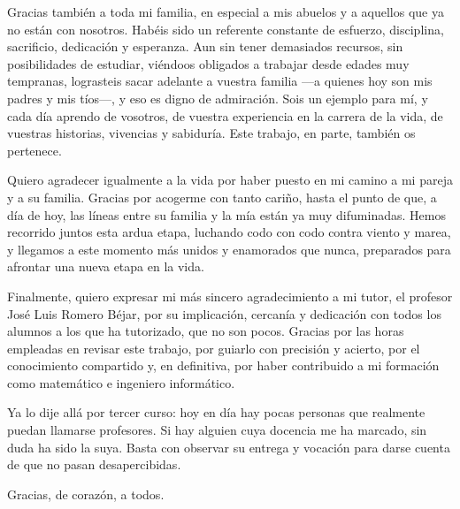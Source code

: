 Gracias también a toda mi familia, en especial a mis abuelos y a aquellos que ya no están con nosotros. Habéis sido un referente constante de esfuerzo, disciplina, sacrificio, dedicación y esperanza. Aun sin tener demasiados recursos, sin posibilidades de estudiar, viéndoos obligados a trabajar desde edades muy tempranas, lograsteis sacar adelante a vuestra familia —a quienes hoy son mis padres y mis tíos—, y eso es digno de admiración. Sois un ejemplo para mí, y cada día aprendo de vosotros, de vuestra experiencia en la carrera de la vida, de vuestras historias, vivencias y sabiduría. Este trabajo, en parte, también os pertenece. \newline

Quiero agradecer igualmente a la vida por haber puesto en mi camino a mi pareja y a su familia. Gracias por acogerme con tanto cariño, hasta el punto de que, a día de hoy, las líneas entre su familia y la mía están ya muy difuminadas. Hemos recorrido juntos esta ardua etapa, luchando codo con codo contra viento y marea, y llegamos a este momento más unidos y enamorados que nunca, preparados para afrontar una nueva etapa en la vida. \newline

Finalmente, quiero expresar mi más sincero agradecimiento a mi tutor, el profesor José Luis Romero Béjar, por su implicación, cercanía y dedicación con todos los alumnos a los que ha tutorizado, que no son pocos. Gracias por las horas empleadas en revisar este trabajo, por guiarlo con precisión y acierto, por el conocimiento compartido y, en definitiva, por haber contribuido a mi formación como matemático e ingeniero informático. \newline

Ya lo dije allá por tercer curso: hoy en día hay pocas personas que realmente puedan llamarse profesores. Si hay alguien cuya docencia me ha marcado, sin duda ha sido la suya. Basta con observar su entrega y vocación para darse cuenta de que no pasan desapercibidas. \newline

Gracias, de corazón, a todos.

\cleardoublepage

